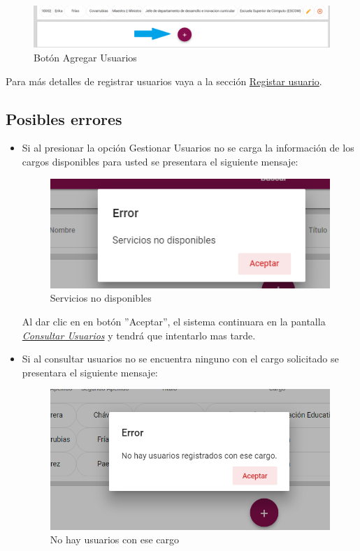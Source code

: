             \begin{figure}[!hbtp]
                \centering
                \hypertarget{add}{\includegraphics[width=0.7\linewidth]{images/SP5/BtnAgregar}}
                \caption{Botón Agregar Usuarios}
                \label{add}
            \end{figure}
    
            Para más detalles de registrar usuarios vaya a la sección \hyperlink{registrar}{Registar usuario}.
            
        \subsection{Posibles errores}
    	  \begin{itemize}	
            	\item Si al  presionar la opción Gestionar Usuarios no se carga la información de los cargos disponibles para usted se presentara el siguiente mensaje:
            
             \begin{figure}[!hbtp]
            	\centering
            	\includegraphics[width=0.4\linewidth]{images/SP5/MSGSN}
            	\caption{Servicios no disponibles}
            	\label{SND}
            	
            \end{figure}
            
            		Al dar clic en en botón ''Aceptar'', el sistema continuara en la pantalla  \hyperlink{consultarUs}{\textit{Consultar Usuarios}} y tendrá que intentarlo  mas tarde.
            
           		\item Si al consultar usuarios no se encuentra ninguno con el cargo solicitado se presentara el siguiente mensaje:
           		 \begin{figure}[!hbtp]
           			\centering
           			\includegraphics[width=0.4\linewidth]{images/SP5/MSG21}
           			\caption{No hay usuarios con ese cargo}
           			\label{mensaje21}
           		\end{figure}
           
           \end{itemize} 
            
